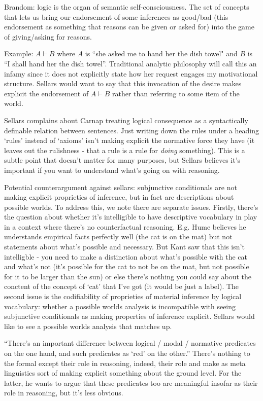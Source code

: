 Brandom: logic is the organ of semantic self-consciousness. The set of concepts that lets us bring our endorsement of some inferences as good/bad (this endorsement as something that reasons can be given or asked for) into the game of giving/asking for reasons.

Example: $A\vdash B$ where $A$ is ``she asked me to hand her the dish towel" and $B$ is ``I shall hand her the dish towel''. Traditional analytic philosophy will call this an infamy since it does not explicitly state how her request engages my motivational structure. Sellars would want to say that this invocation of the desire makes explicit the endorsement of $A \vdash B$ rather than referring to some item of the world.

Sellars complains about Carnap treating logical consequence as a syntactically definable relation between sentences. Just writing down the rules under a heading `rules' instead of `axioms' isn't making explicit the normative force they have (it leaves out the rulishness - that a rule is a rule for \emph{doing} something). This is a subtle point that doesn't matter for many purposes, but Sellars believes it's important if you want to understand what's going on with reasoning.

Potential counterargument against sellars: subjunctive conditionals are not making explicit proprieties of inference, but in fact are descriptions about possible worlds. To address this, we note there are separate issues. Firstly, there's the question about whether it's intelligible to have descriptive vocabulary in play in a context where there's no counterfactual reasoning. E.g. Hume believes he understands empirical facts perfectly well (the cat is on the mat) but not statements about what's possible and necessary. But Kant saw that this isn't intelligble - you need to make a distinction about what's possible with the cat and what's not (it's possible for the cat to not be on the mat, but not possible for it to be larger than the sun) or else there's nothing you could say about the conctent of the concept of `cat' that I've got (it would be just a label). The second issue is the codifiability of proprieties of material inference by logical vocabulary: whether a possible worlds analysis is incompatible with seeing subjunctive conditionals as making properties of inference explicit. Sellars would like to see a possible worlds analysis that matches up.

``There's an important difference between logical / modal / normative predicates on the one hand, and such predicates as `red' on the other.'' There's nothing to the formal except their role in reasoning, indeed, their role and make as meta linguistics sort of making explicit something about the ground level. For the latter, he wants to argue that these predicates too are meaningful insofar as their role in reasoning, but it's less obvious.


